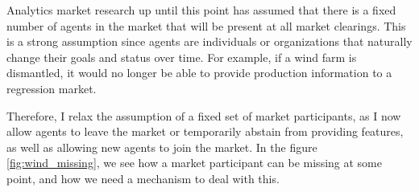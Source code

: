 Analytics market research up until this point has assumed that there is a fixed
number of agents in the market that will be present at all market clearings.
This is a strong assumption since agents are individuals or organizations that
naturally change their goals and status over time. For example, if a wind farm
is dismantled, it would no longer be able to provide production information to
a regression market.

Therefore, I relax the assumption of a fixed set of market participants, as I
now allow agents to leave the market or temporarily abstain from providing
features, as well as allowing new agents to join the market. In the figure
\ref{fig:wind_missing}, we see how a market participant can be missing at some
point, and how we need a mechanism to deal with this.

